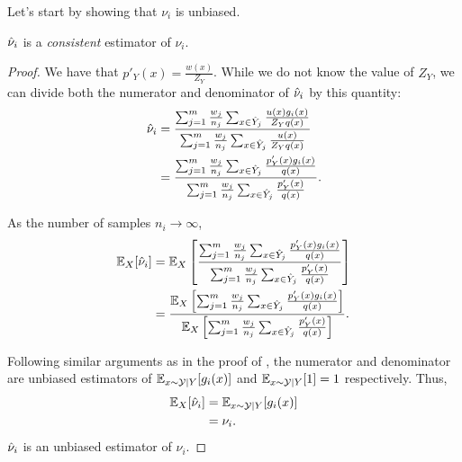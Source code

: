 Let's start by showing that $\nu_i$ is unbiased.
\begin{theorem}
\label{thm:nuh}
  ${\hat{\nu}}_i$ is a \textit{consistent} estimator of $\nu_i$.
\end{theorem}
\begin{proof}
  We have that $p'_Y(x) = \frac{w(x)}{Z_Y}$.
  While we do not know the value of $Z_Y$, we can divide both the numerator and denominator of ${\hat{\nu}}_i$ by this quantity:
  \begin{align*}
    {\hat{\nu}}_i 
    &= \frac{\sum_{j=1}^m \frac{w_j}{n_j} \sum_{x \in {\hat{Y}}_j} \frac{u(x) g_i(x)}{Z_Y q(x)}}{\sum_{j=1}^m \frac{w_j}{n_j} \sum_{x \in {\hat{Y}}_j} \frac{u(x)}{Z_Y q(x)}} \\
    &= \frac{\sum_{j=1}^m \frac{w_j}{n_j} \sum_{x \in {\hat{Y}}_j} \frac{p'_Y(x) g_i(x)}{q(x)}}{\sum_{j=1}^m \frac{w_j}{n_j} \sum_{x \in {\hat{Y}}_j} \frac{p'_Y(x)}{q(x)}}.
  \end{align*}

  As the number of samples $n_i \to \infty$,
  \begin{align*}
    \mathbb{E}_{X}[{\hat{\nu}}_i] 
    &= \mathbb{E}_{X}\left[ \frac{\sum_{j=1}^m \frac{w_j}{n_j} \sum_{x \in {\hat{Y}}_j} \frac{p'_Y(x) g_i(x)}{q(x)}}{\sum_{j=1}^m \frac{w_j}{n_j} \sum_{x \in {\hat{Y}}_j} \frac{p'_Y(x)}{q(x)}} \right] \\
    &= \frac{\mathbb{E}_{X}\left[ \sum_{j=1}^m \frac{w_j}{n_j} \sum_{x \in {\hat{Y}}_j} \frac{p'_Y(x) g_i(x)}{q(x)} \right]}
    {\mathbb{E}_{X}\left[\sum_{j=1}^m \frac{w_j}{n_j} \sum_{x \in {\hat{Y}}_j} \frac{p'_Y(x)}{q(x)}\right]}.
  \end{align*}

  Following similar arguments as in the proof of , the numerator and denominator are unbiased estimators of $\mathbb{E}_{x \sim \mathcal{Y} \mid Y}[g_i(x)]$ and $\mathbb{E}_{x \sim \mathcal{Y} \mid Y}[1] = 1$ respectively.
  Thus,
  \begin{align*}
    \mathbb{E}_{X}[{\hat{\nu}}_i] 
    &= \mathbb{E}_{x \sim \mathcal{Y} \mid Y}[g_i(x)] \\
    &= \nu_i.
  \end{align*}
  ${\hat{\nu}}_i$ is an unbiased estimator of $\nu_i$.

\end{proof}

